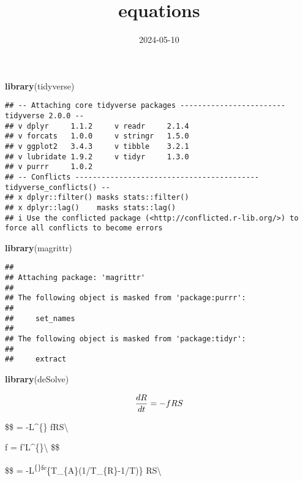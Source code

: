\documentclass[
]{article}
\title{equations}
\author{}
\date{\vspace{-2.5em}2024-05-10}
\newenvironment{Shaded}{\begin{snugshade}}{\end{snugshade}}
\newcommand{\FunctionTok}[1]{\textcolor[rgb]{0.13,0.29,0.53}{\textbf{#1}}}
\newcommand{\NormalTok}[1]{#1}
\begin{document}
\maketitle

\begin{Shaded}
\begin{Highlighting}[]
\FunctionTok{library}\NormalTok{(tidyverse)}
\end{Highlighting}
\end{Shaded}

\begin{verbatim}
## -- Attaching core tidyverse packages ------------------------ tidyverse 2.0.0 --
## v dplyr     1.1.2     v readr     2.1.4
## v forcats   1.0.0     v stringr   1.5.0
## v ggplot2   3.4.3     v tibble    3.2.1
## v lubridate 1.9.2     v tidyr     1.3.0
## v purrr     1.0.2     
## -- Conflicts ------------------------------------------ tidyverse_conflicts() --
## x dplyr::filter() masks stats::filter()
## x dplyr::lag()    masks stats::lag()
## i Use the conflicted package (<http://conflicted.r-lib.org/>) to force all conflicts to become errors
\end{verbatim}

\begin{Shaded}
\begin{Highlighting}[]
\FunctionTok{library}\NormalTok{(magrittr)}
\end{Highlighting}
\end{Shaded}

\begin{verbatim}
## 
## Attaching package: 'magrittr'
## 
## The following object is masked from 'package:purrr':
## 
##     set_names
## 
## The following object is masked from 'package:tidyr':
## 
##     extract
\end{verbatim}

\begin{Shaded}
\begin{Highlighting}[]
\FunctionTok{library}\NormalTok{(deSolve)}
\end{Highlighting}
\end{Shaded}

\[
\frac{dR}{dt} = -fRS \\
\]

\$\$  = -L\^{}\{\gamma\} fRS\textbackslash{}

f = f'L\^{}\{\gamma\}\textbackslash{} \$\$

\$\$  =
-L\textsuperscript{\{\gamma\}fe}\{T\_\{A\}(1/T\_\{R\}-1/T)\}
RS\textbackslash{}
\end{document}
